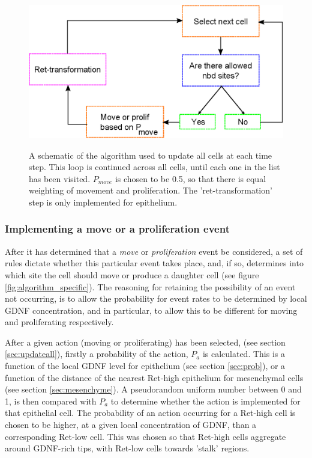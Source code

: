 \documentclass[pdftex,10pt,a4paper,twocolumn]{article}
\begin{document}
\begin{figure}[t] 
\centering
\scalebox{0.8} 
{\includegraphics{algorithm.eps}}
\caption{A schematic of the algorithm used to update all cells at each time step. This loop is continued across all cells, until each one in the list has been visited. $P_{move}$ is chosen to be 0.5, so that there is equal weighting of movement and proliferation. The 'ret-transformation' step is only implemented for epithelium.}\label{fig:algorithm}
\end{figure}

\subsubsection{Implementing a move or a proliferation event}
After it has determined that a \textit{move} or \textit{proliferation} event be considered, a set of rules dictate whether this particular event takes place, and, if so, determines into which site the cell should move or produce a daughter cell (see figure \ref{fig:algorithm_specific}). The reasoning for retaining the possibility of an event not occurring, is to allow the probability for event rates to be determined by local GDNF concentration, and in particular, to allow this to be different for moving and proliferating respectively. 

After a given action (moving or proliferating) has been selected, (see section \ref{sec:updateall}), firstly a probability of the action, $P_a$ is calculated. This is a function of the local GDNF level for epithelium (see section \ref{sec:prob}), or a function of the distance of the nearest Ret-high epithelium for mesenchymal cells (see section \ref{sec:mesenchyme}). A pseudorandom uniform number between 0 and 1, is then compared with $P_a$ to determine whether the action is implemented for that epithelial cell. The probability of an action occurring for a Ret-high cell is chosen to be higher, at a given local concentration of GDNF, than a corresponding Ret-low cell. This was chosen so that Ret-high cells aggregate around GDNF-rich tips, with Ret-low cells towards 'stalk' regions.
\end{document}
